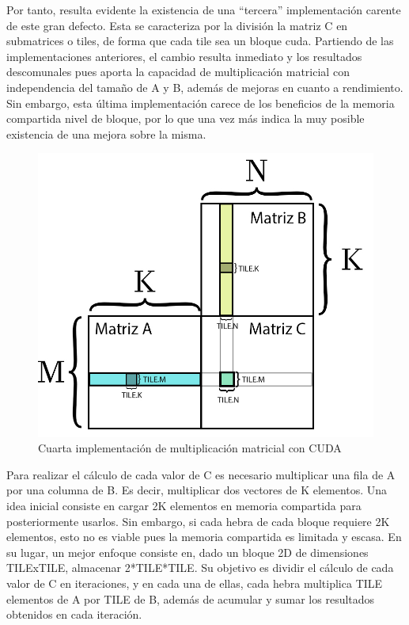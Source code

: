 Por tanto, resulta evidente la existencia de una ``tercera'' implementación carente de este gran defecto. Esta se caracteriza por la división la matriz C en submatrices o tiles, de forma que cada tile sea un bloque cuda. Partiendo de las implementaciones anteriores, el cambio resulta inmediato y los resultados descomunales pues aporta la capacidad de multiplicación matricial con independencia del tamaño de A y B, además de mejoras en cuanto a rendimiento. \cite{cuda_mult_matrix_v3} \\
Sin embargo, esta última implementación carece de los beneficios de la memoria compartida nivel de bloque, por lo que una vez más indica la muy posible existencia de una mejora sobre la misma. \\

\begin{figure}[H]
	\centering
	\includegraphics[scale=0.3]{imagenes/gemm_tile_v4.jpg}  
	\caption{Cuarta implementación de multiplicación matricial con CUDA}
	\label{fig:mult_matrix_cuda_v4}
\end{figure}
Para realizar el cálculo de cada valor de C es necesario multiplicar una fila de A por una columna de B. Es decir, multiplicar dos vectores de K elementos. Una idea inicial consiste en cargar 2K elementos en memoria compartida para posteriormente usarlos. Sin embargo, si cada hebra de cada bloque requiere 2K elementos, esto no es viable pues la memoria compartida es limitada y escasa. En su lugar, un mejor enfoque consiste en, dado un bloque 2D de dimensiones TILExTILE, almacenar 2*TILE*TILE. Su objetivo es dividir el cálculo de cada valor de C en iteraciones, y en cada una de ellas, cada hebra multiplica TILE elementos de A por TILE de B, además de acumular y sumar los resultados obtenidos en cada iteración. \cite{nvidia_mult_matrix_v4}
